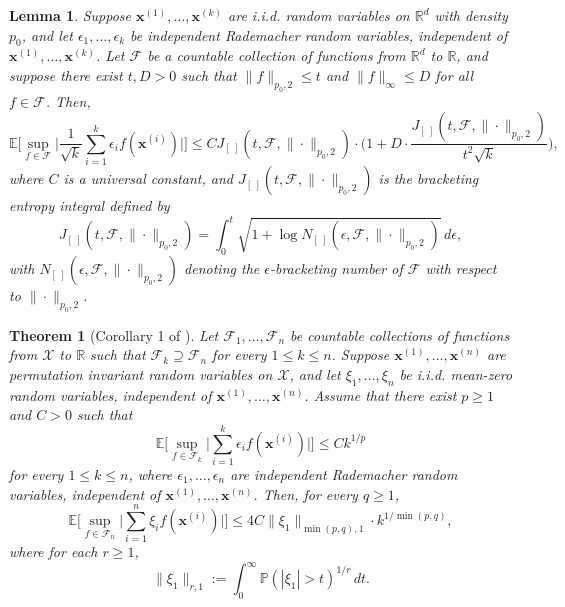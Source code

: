 \documentclass[10pt]{article}
\newtheorem{theorem}{Theorem}
\newtheorem{lemma}{Lemma}
\newcommand{\E}{{\mathbb E}}
\newcommand{\F}{{\mathcal{F}}}
\newcommand{\R}{{\mathbb R}}
\renewcommand{\P}{{\mathbb P}}
\newcommand{\xbf}{{\mathbf{x}}}
\begin{document}
\begin{lemma}\label{lem:bracketing-integral-bound}
    Suppose $\xbf^{(1)}, \dots, \xbf^{(k)}$ are i.i.d. random 
    variables on $\R^d$ with density $p_0$, and let 
    $\epsilon_1, \dots, \epsilon_k$ be independent Rademacher random variables, 
    independent of $\xbf^{(1)}, \dots, \xbf^{(k)}$. Let $\F$ be a 
    countable collection of functions from $\R^d$ to $\R$, and suppose there 
    exist $t, D > 0$ such that $\|f\|_{p_0, 2} \le t$ and 
    $\|f\|_{\infty} \le D$ for all $f \in \F$. Then, 
    \begin{equation*}
        \E\Big[\sup_{f \in \F} \Big|\frac{1}{\sqrt{k}} 
        \sum_{i = 1}^{k} \epsilon_i f(\xbf^{(i)})\Big|\Big] 
        \le C J_{[ \ ]}(t, \F, \| \cdot \|_{p_0, 2}) 
        \cdot \Big(1 + D \cdot 
        \frac{J_{[ \ ]}(t, \F, \| \cdot \|_{p_0, 2})}{t^2 \sqrt{k}}\Big),
    \end{equation*}
    where $C$ is a universal constant, and 
    $J_{[ \ ]}(t, \F, \| \cdot \|_{p_0, 2})$ is the bracketing entropy integral defined by
    \begin{equation*}
        J_{[ \ ]}(t, \F, \| \cdot \|_{p_0, 2}) = \int_{0}^{t} 
        \sqrt{1 + \log N_{[ \ ]}(\epsilon, \F, \| \cdot \|_{p_0, 2})} \, d\epsilon,
    \end{equation*}
    with $N_{[ \ ]}(\epsilon, \F, \| \cdot \|_{p_0, 2})$ denoting the 
    $\epsilon$-bracketing number of $\F$ with respect to $\| \cdot \|_{p_0, 2}$.
\end{lemma}

\begin{theorem}[Corollary 1 of \citet{han2019convergence}]
\label{thm:han2019convergence}
    Let $\F_1, \dots, \F_n$ be countable collections of functions from 
    $\mathcal{X}$ to $\R$ such that $\F_k \supseteq \F_n$ for every 
    $1 \le k \le n$. Suppose $\xbf^{(1)}, \dots, \xbf^{(n)}$
    are permutation invariant random variables on $\mathcal{X}$, and let 
    $\xi_1, \dots, \xi_n$ be i.i.d. mean-zero random variables, 
    independent of $\xbf^{(1)}, \dots, \xbf^{(n)}$. Assume that
    there exist $p \ge 1$ and $C > 0$ such that
    \begin{equation*}
        \E\Big[\sup_{f \in \F_k} 
        \Big|\sum_{i = 1}^{k} \epsilon_i f(\xbf^{(i)})\Big| \Big]
        \le C k^{1/p}
    \end{equation*}
    for every $1 \le k \le n$, where $\epsilon_1, \dots, \epsilon_n$ are 
    independent Rademacher random variables, independent of 
    $\xbf^{(1)}, \dots, \xbf^{(n)}$. 
    Then, for every $q \ge 1$, 
    \begin{equation*}
        \E\Big[\sup_{f \in \F_n} 
        \Big|\sum_{i = 1}^{n} \xi_i f(\xbf^{(i)})\Big| \Big]
        \le 4C \|\xi_1\|_{\min(p, q), 1} \cdot k^{1/\min(p, q)},
    \end{equation*}
    where for each $r \ge 1$,
    \begin{equation*}
        \|\xi_1\|_{r, 1} := \int_{0}^{\infty} \P(|\xi_1| > t)^{1/r} \, dt.
    \end{equation*}
\end{theorem}
\end{document}
